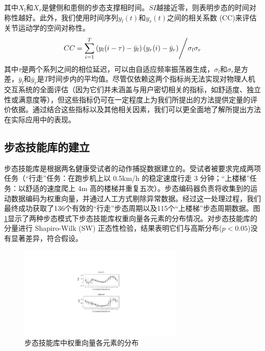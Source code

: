 其中${X_{\text{l}}}$和${X_r}$是健侧和患侧的步态支撑相时间。$SI$越接近零，则表明步态的时间对称性越好。此外，我们使用时间序列${y_l(t)}$和${y_r(t)}$之间的相关系数 (CC)\cite{gouwandaIdentifyingGaitAsymmetry2011}来评估关节运动学的空间对称性。
\begin{equation}
\label{deqn_ex22}
CC = {{\sum\limits_{i = 1}^T {\left( {{y_l}(i - \tau) - {{\bar y}_l}} \right)} \left( {{y_r}(i ) - {{\bar y}_r}} \right)} \mathord{\left/
{\vphantom {{\sum\limits_{i = 1}^T {\left( {{y_l}(i) - {{\bar y}_l}} \right)}\left( {{y_r}(i + \tau ) - {{\bar y}_r}} \right)} {{\sigma _l}{\sigma _r}}}} \right.
\kern-\nulldelimiterspace} {{\sigma _l}{\sigma _r}}}
\end{equation}
其中$\tau$是两个系列之间的相位延迟，可以由自适应频率振荡器生成，${\sigma _l}$和${\sigma _r}$是方差，$\bar y_l$和$\bar y_r$是${T}$时间步内的平均值。尽管仅依赖这两个指标尚无法实现对物理人机交互系统的全面评估（因为它们并未涵盖与用户密切相关的指标，如舒适度、独立性或满意度等），但这些指标仍可在一定程度上为我们所提出的方法提供定量的评价依据。通过结合这些指标以及其他相关因素，我们可以更全面地了解所提出方法在实际应用中的表现。

\subsection{步态技能库的建立}步态技能库是根据两名健康受试者的动作捕捉数据建立的。受试者被要求完成两项任务（``行走''任务：在跑步机上以 0.5km/h 的稳定速度行走 3 分钟；``上楼梯''任务：以舒适的速度爬上 4m 高的楼梯并重复五次）。步态编码器负责将收集到的运动数据编码为权重向量，并通过人工方式剔除异常数据。经过这一处理过程，我们最终成功获取了136个有效的``行走''步态周期以及115个``上楼梯''步态周期数据。图\ref{fig:5-3}显示了两种步态模式下步态技能库权重向量各元素的分布情况。对步态技能库的分量进行 Shapiro-Wilk (SW) 正态性检验，结果表明它们与高斯分布($p<0.05$)没有显著差异，符合假设。
\begin{figure}[htb]
  \centering\includegraphics[width=0.7\textwidth]{figures/5-Fig-3.pdf}
  \caption{步态技能库中权重向量各元素的分布}
  \label{fig:5-3}
\end{figure}


